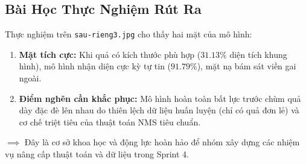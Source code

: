 \documentclass[11pt,a4paper]{article}
\begin{document}
\subsection{Bài Học Thực Nghiệm Rút Ra}
Thực nghiệm trên \texttt{sau-rieng3.jpg} cho thấy hai mặt của mô hình:
\begin{enumerate}[leftmargin=1.5em]
    \item \textbf{Mặt tích cực:} Khi quả có kích thước phù hợp ($31.13\%$ diện tích khung hình), mô hình nhận diện cực kỳ tự tin ($91.79\%$), mặt nạ bám sát viền gai ngoài.
    \item \textbf{Điểm nghẽn cần khắc phục:} Mô hình hoàn toàn bất lực trước chùm quả dày đặc đè lên nhau do thiên lệch dữ liệu huấn luyện (chỉ có quả đơn lẻ) và cơ chế triệt tiêu của thuật toán NMS tiêu chuẩn.
\end{enumerate}
$\implies$ Đây là cơ sở khoa học và động lực hoàn hảo để nhóm xây dựng các nhiệm vụ nâng cấp thuật toán và dữ liệu trong Sprint 4.
\end{document}

